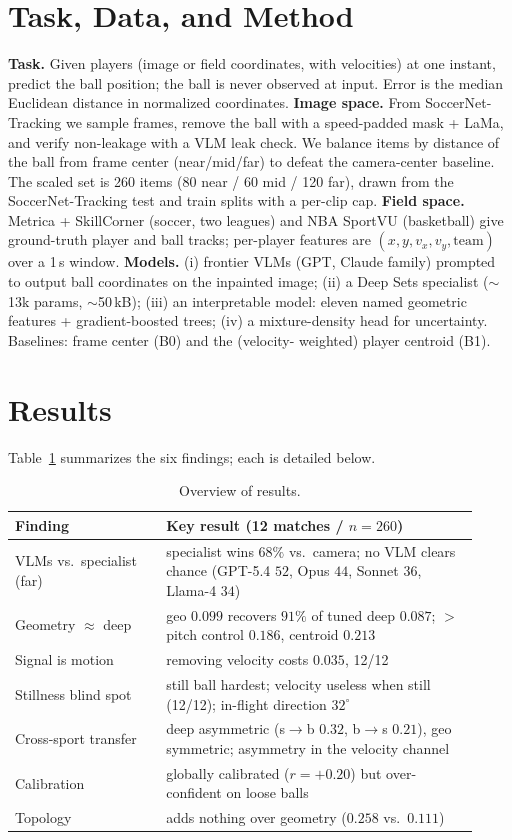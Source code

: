 \section{Task, Data, and Method}
\textbf{Task.} Given players (image or field coordinates, with velocities) at one instant,
predict the ball position; the ball is never observed at input. Error is the median
Euclidean distance in normalized coordinates.
\textbf{Image space.} From SoccerNet-Tracking we sample frames, remove the ball with a
speed-padded mask + LaMa, and verify non-leakage with a VLM leak check. We balance items
by distance of the ball from frame center (near/mid/far) to defeat the camera-center
baseline. The scaled set is 260 items (80 near / 60 mid / 120 far), drawn from the
SoccerNet-Tracking test and train splits with a per-clip cap.
\textbf{Field space.} Metrica + SkillCorner (soccer, two leagues) and NBA SportVU
(basketball) give ground-truth player and ball tracks; per-player features are
$(x,y,v_x,v_y,\text{team})$ over a 1\,s window.
\textbf{Models.} (i) frontier VLMs (GPT, Claude family) prompted to output ball
coordinates on the inpainted image; (ii) a Deep Sets specialist ($\sim$13k params, $\sim$50\,kB); (iii)
an interpretable model: eleven named geometric features + gradient-boosted trees; (iv)
a mixture-density head for uncertainty. Baselines: frame center (B0) and the (velocity-
weighted) player centroid (B1).

\section{Results}
Table~\ref{tab:overview} summarizes the six findings; each is detailed below.

\begin{table}[h]\centering\small
\begin{tabular}{@{}p{0.30\linewidth}p{0.62\linewidth}@{}}
\toprule
Finding & Key result (12 matches / $n{=}260$) \\
\midrule
VLMs vs.\ specialist (far) & specialist wins $68\%$ vs.\ camera; no VLM clears chance (GPT-5.4 $52$, Opus $44$, Sonnet $36$, Llama-4 $34$) \\
Geometry $\approx$ deep & geo $0.099$ recovers $91\%$ of tuned deep $0.087$; $>$ pitch control $0.186$, centroid $0.213$ \\
Signal is motion & removing velocity costs $0.035$, 12/12 \\
Stillness blind spot & still ball hardest; velocity useless when still (12/12); in-flight direction $32^\circ$ \\
Cross-sport transfer & deep asymmetric (s$\to$b $0.32$, b$\to$s $0.21$), geo symmetric; asymmetry in the velocity channel \\
Calibration & globally calibrated ($r{=}{+}0.20$) but over-confident on loose balls \\
Topology & adds nothing over geometry ($0.258$ vs.\ $0.111$) \\
\bottomrule
\end{tabular}
\caption{Overview of results.}
\label{tab:overview}
\end{table}

